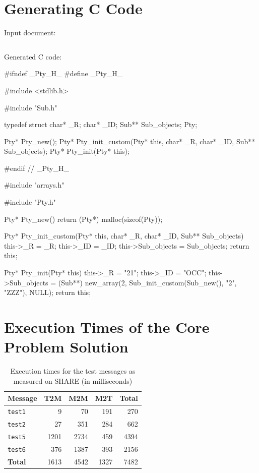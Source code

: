\section{Generating C Code}
\label{sec:AppendixGeneratingCCode}

Input document:

\inputminted[fontsize=\fontsize{8}{8},linenos,numbersep=5pt,frame=lines,framesep=2mm]{xml}{listings/example-for-c-code.xml}

Generated C code:

\begin{ccode}
#ifndef _Pty_H_
#define _Pty_H_

#include <stdlib.h>

#include "Sub.h"

typedef struct {
  char* _R;
  char* _ID;
  Sub** Sub_objects;
} Pty;

Pty* Pty_new();
Pty* Pty_init_custom(Pty* this, char* _R, char* _ID, Sub** Sub_objects);
Pty* Pty_init(Pty* this);

#endif // _Pty_H_	
\end{ccode}
%
\begin{ccode}
#include "arrays.h"

#include "Pty.h"

Pty* Pty_new() {
  return (Pty*) malloc(sizeof(Pty));
}

Pty* Pty_init_custom(Pty* this, char* _R, char* _ID, Sub** Sub_objects) {
  this->_R = _R;
  this->_ID = _ID;
  this->Sub_objects = Sub_objects;
  return this;
}

Pty* Pty_init(Pty* this) {
  this->_R = "21";
  this->_ID = "OCC";
  this->Sub_objects = (Sub**) new_array(2, Sub_init_custom(Sub_new(), "2", "ZZZ"), NULL);
  return this;
}
\end{ccode}

\section{Execution Times of the Core Problem Solution}
\label{sec:AppendixExecutionTime}

\begin{table}[h!t]
  \centering
  \begin{tabular}{| l | r | r | r | r |}
    \hline
    \textbf{Message} & \textbf{T2M} & \textbf{M2M} & \textbf{M2T} & \textbf{Total} \\
    \hline
    \texttt{test1}   & 9      & 70     & 191   & 270  \\
    \texttt{test2}   & 27     & 351    & 284   & 662  \\
    \texttt{test5}   & 1201   & 2734   & 459   & 4394 \\
    \texttt{test6}   & 376    & 1387   & 393   & 2156 \\
    \hline
    \textbf{Total}   & 1613   & 4542   & 1327  & 7482 \\
    \hline
  \end{tabular}
  \caption{Execution times for the test \FIXML messages as measured on SHARE (in milliseconds)}
  \label{tab:ExecutionTime}
\end{table}

